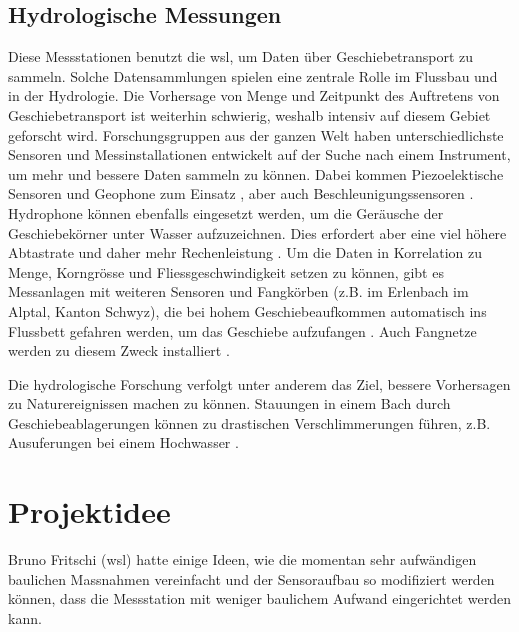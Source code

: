 \subsection{Hydrologische Messungen}
Diese Messstationen benutzt die \gls{wsl}, um Daten über Geschiebetransport zu sammeln. Solche Datensammlungen spielen eine zentrale Rolle im Flussbau und in der \gls{Hydrologie}. Die Vorhersage von Menge und Zeitpunkt des Auftretens von Geschiebetransport ist weiterhin schwierig, weshalb intensiv auf diesem Gebiet geforscht wird. Forschungsgruppen aus der ganzen Welt haben unterschiedlichste Sensoren und Messinstallationen entwickelt auf der Suche nach einem Instrument, um mehr und bessere Daten sammeln zu können. Dabei kommen Piezoelektische Sensoren und Geophone zum Einsatz \cite{rickenmann2012ESPL}, aber auch Beschleunigungssensoren \cite{reid2007}. Hydrophone können ebenfalls eingesetzt werden, um die Geräusche der Geschiebekörner unter Wasser aufzuzeichnen. Dies erfordert aber eine viel höhere Abtastrate und daher mehr Rechenleistung \cite{wyss2014}. Um die Daten in Korrelation zu Menge, Korngrösse und Fliessgeschwindigkeit setzen zu können, gibt es Messanlagen mit weiteren Sensoren und Fangkörben (z.B. im Erlenbach im Alptal, Kanton Schwyz), die bei hohem Geschiebeaufkommen automatisch ins Flussbett gefahren werden, um das Geschiebe aufzufangen \cite{rickenmann2014ESPL}. Auch Fangnetze werden zu diesem Zweck installiert \cite{rickenmann2014ESPL}. 

Die hydrologische Forschung verfolgt unter anderem das Ziel, bessere Vorhersagen zu Naturereignissen machen zu können. Stauungen in einem Bach durch Geschiebeablagerungen können zu drastischen Verschlimmerungen führen, z.B. Ausuferungen bei einem Hochwasser \cite{turowski2008}.

\section{Projektidee}
Bruno Fritschi (\gls{wsl}) hatte einige Ideen, wie die momentan sehr aufwändigen baulichen Massnahmen vereinfacht und der Sensoraufbau so modifiziert werden können, dass die Messstation mit weniger baulichem Aufwand eingerichtet werden kann.

